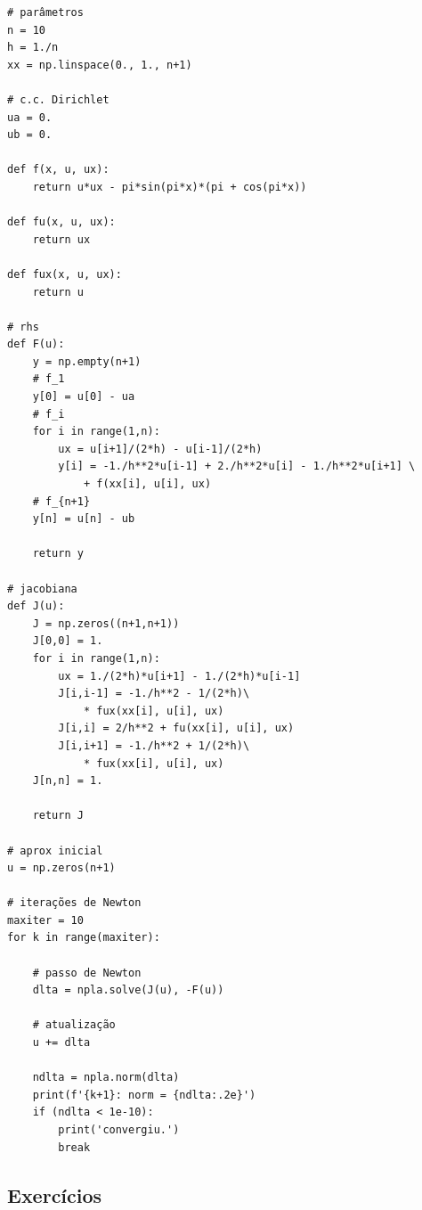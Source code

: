 \begin{ex}
\begin{lstlisting}[caption=mdf-newton.py]
# parâmetros
n = 10
h = 1./n
xx = np.linspace(0., 1., n+1)

# c.c. Dirichlet
ua = 0.
ub = 0.

def f(x, u, ux):
    return u*ux - pi*sin(pi*x)*(pi + cos(pi*x))

def fu(x, u, ux):
    return ux

def fux(x, u, ux):
    return u

# rhs
def F(u):
    y = np.empty(n+1)
    # f_1
    y[0] = u[0] - ua
    # f_i
    for i in range(1,n):
        ux = u[i+1]/(2*h) - u[i-1]/(2*h) 
        y[i] = -1./h**2*u[i-1] + 2./h**2*u[i] - 1./h**2*u[i+1] \
            + f(xx[i], u[i], ux)
    # f_{n+1}
    y[n] = u[n] - ub

    return y

# jacobiana
def J(u):
    J = np.zeros((n+1,n+1))
    J[0,0] = 1.
    for i in range(1,n):
        ux = 1./(2*h)*u[i+1] - 1./(2*h)*u[i-1]
        J[i,i-1] = -1./h**2 - 1/(2*h)\
            * fux(xx[i], u[i], ux)
        J[i,i] = 2/h**2 + fu(xx[i], u[i], ux)
        J[i,i+1] = -1./h**2 + 1/(2*h)\
            * fux(xx[i], u[i], ux)
    J[n,n] = 1.

    return J

# aprox inicial
u = np.zeros(n+1)

# iterações de Newton
maxiter = 10
for k in range(maxiter):

    # passo de Newton
    dlta = npla.solve(J(u), -F(u))

    # atualização
    u += dlta

    ndlta = npla.norm(dlta)
    print(f'{k+1}: norm = {ndlta:.2e}')
    if (ndlta < 1e-10):
        print('convergiu.')
        break
\end{lstlisting}
\end{ex}

\subsection{Exercícios}

